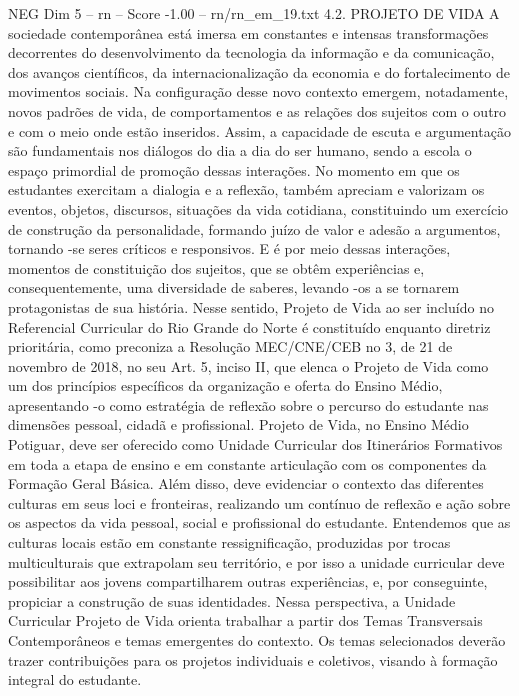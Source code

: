 \begin{textsample}{NEG Dim 5 – rn – Score -1.00 – rn/rn\_em\_19.txt}  \label{ex:f5_neg_147}
4.2.
PROJETO DE VIDA A sociedade contemporânea está imersa em constantes e intensas transformações decorrentes do desenvolvimento da tecnologia da informação e da comunicação, dos avanços científicos, da internacionalização da economia e do fortalecimento de movimentos sociais.
Na configuração desse novo contexto emergem, notadamente, novos padrões de vida, de comportamentos e as relações dos sujeitos com o outro e com o meio onde estão inseridos.
Assim, a capacidade de escuta e argumentação são fundamentais nos diálogos do dia a dia do ser humano, sendo a escola o espaço primordial de promoção dessas interações.
No momento em que os estudantes exercitam a dialogia e a reflexão, também apreciam e valorizam os eventos, objetos, discursos, situações da vida cotidiana, constituindo um exercício de construção da personalidade, formando juízo de valor e adesão a argumentos, tornando -se seres críticos e responsivos.
E é por meio dessas interações, momentos de constituição dos sujeitos, que se obtêm experiências e, consequentemente, uma diversidade de saberes, levando -os a se tornarem protagonistas de sua história.
Nesse sentido, Projeto de Vida ao ser incluído no Referencial Curricular do Rio Grande do Norte é constituído enquanto diretriz prioritária, como preconiza a Resolução MEC/CNE/CEB no 3, de 21 de novembro de 2018, no seu Art. 5, inciso II, que elenca o Projeto de Vida como um dos princípios específicos da organização e oferta do Ensino Médio, apresentando -o como estratégia de reflexão sobre o percurso do estudante nas dimensões pessoal, cidadã e profissional.
Projeto de Vida, no Ensino Médio Potiguar, deve ser oferecido como Unidade Curricular dos Itinerários Formativos em toda a etapa de ensino e em constante articulação com os componentes da Formação Geral Básica.
Além disso, deve evidenciar o contexto das diferentes culturas em seus loci e fronteiras, realizando um contínuo de reflexão e ação sobre os aspectos da vida pessoal, social e profissional do estudante.
Entendemos que as culturas locais estão em constante ressignificação, produzidas por trocas multiculturais que extrapolam seu território, e por isso a unidade curricular deve possibilitar aos jovens compartilharem outras experiências, e, por conseguinte, propiciar a construção de suas identidades.
Nessa perspectiva, a Unidade Curricular Projeto de Vida orienta trabalhar a partir dos Temas Transversais Contemporâneos e temas emergentes do contexto.
Os temas selecionados deverão trazer contribuições para os projetos individuais e coletivos, visando à formação integral do estudante.

\end{textsample}
